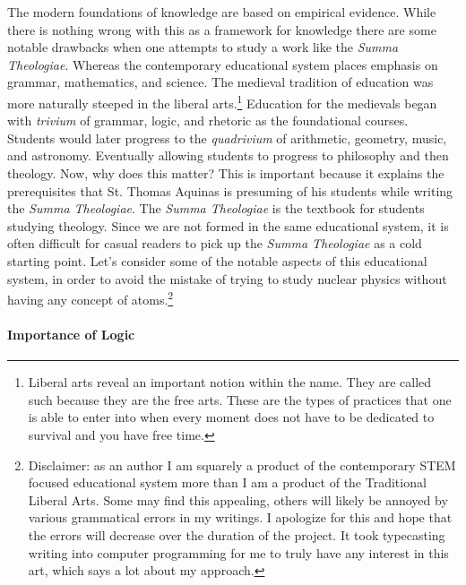 \documentclass{ucetd}
\begin{document}
The modern foundations of knowledge are based on empirical evidence. While there is nothing wrong with this as a framework for knowledge there are some notable drawbacks when one attempts to study a work like the \textit{Summa Theologiae}. Whereas the contemporary educational system places emphasis on grammar, mathematics, and science. The medieval tradition of education was more naturally steeped in the liberal arts.\footnote{Liberal arts reveal an important notion within the name. They are called such because they are the free arts. These are the types of practices that one is able to enter into when every moment does not have to be dedicated to survival and you have free time.} Education for the medievals began with \textit{trivium} of grammar, logic, and rhetoric as the foundational courses. Students would later progress to the \textit{quadrivium} of arithmetic, geometry, music, and astronomy. Eventually allowing students to progress to philosophy and then theology. Now, why does this matter? This is important because it explains the prerequisites that St. Thomas Aquinas is presuming of his students while writing the \textit{Summa Theologiae}. The \textit{Summa Theologiae} is the textbook for students studying theology. Since we are not formed in the same educational system, it is often difficult for casual readers to pick up the \textit{Summa Theologiae} as a cold starting point. Let's consider some of the notable aspects of this educational system, in order to avoid the mistake of trying to study nuclear physics without having any concept of atoms.\footnote{Disclaimer: as an author I am squarely a product of the contemporary STEM focused educational system more than I am a product of the Traditional Liberal Arts. Some may find this appealing, others will likely be annoyed by various grammatical errors in my writings. I apologize for this and hope that the errors will decrease over the duration of the project. It took typecasting writing into computer programming for me to truly have any interest in this art, which says a lot about my approach.
}
\paragraph{Importance of Logic}
\end{document}
